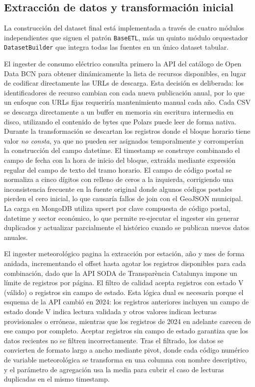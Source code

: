 \documentclass[12pt, a4paper]{article}
\begin{document}
\subsection{Extracción de datos y transformación inicial}


La construcción del dataset final está implementada a través de cuatro módulos independientes que siguen el patrón \texttt{BaseETL}, más un quinto módulo orquestador \texttt{DatasetBuilder} que integra todas las fuentes en un único dataset tabular.

El ingester de consumo eléctrico consulta primero la API del catálogo de Open Data BCN para obtener dinámicamente la lista de recursos disponibles, en lugar de codificar directamente las URLs de descarga. Esta decisión es deliberada: los identificadores de recurso cambian con cada nueva publicación anual, por lo que un enfoque con URLs fijas requeriría mantenimiento manual cada año. Cada CSV se descarga directamente a un buffer en memoria sin escritura intermedia en disco, utilizando el contenido de bytes que Polars puede leer de forma nativa. Durante la transformación se descartan los registros donde el bloque horario tiene valor \textit{no consta}, ya que no pueden ser asignados temporalmente y corromperían la construcción del campo datetime. El timestamp se construye combinando el campo de fecha con la hora de inicio del bloque, extraída mediante expresión regular del campo de texto del tramo horario. El campo de código postal se normaliza a cinco dígitos con relleno de ceros a la izquierda, corrigiendo una inconsistencia frecuente en la fuente original donde algunos códigos postales pierden el cero inicial, lo que causaría fallos de join con el GeoJSON municipal. La carga en MongoDB utiliza upsert por clave compuesta de código postal, datetime y sector económico, lo que permite re-ejecutar el ingester sin generar duplicados y actualizar parcialmente el histórico cuando se publican nuevos datos anuales.

El ingester meteorológico pagina la extracción por estación, año y mes de forma anidada, incrementando el offset hasta agotar los registros disponibles para cada combinación, dado que la API SODA de Transparència Catalunya impone un límite de registros por página. El filtro de calidad acepta registros con estado V (válido) o registros sin campo de estado. Esta lógica dual es necesaria porque el esquema de la API cambió en 2024: los registros anteriores incluyen un campo de estado donde V indica lectura validada y otros valores indican lecturas provisionales o erróneas, mientras que los registros de 2024 en adelante carecen de ese campo por completo. Aceptar registros sin campo de estado garantiza que los datos recientes no se filtren incorrectamente. Tras el filtrado, los datos se convierten de formato largo a ancho mediante pivot, donde cada código numérico de variable meteorológica se transforma en una columna con nombre descriptivo, y el parámetro de agregación usa la media para cubrir el caso de lecturas duplicadas en el mismo timestamp.
\end{document}
